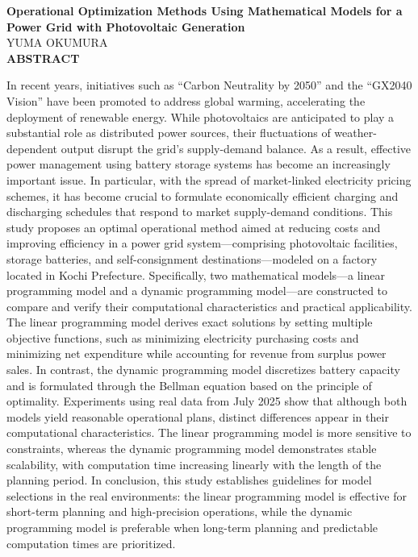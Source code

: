 \begin{center}

{\LARGE \bf Operational Optimization Methods Using Mathematical Models for a Power Grid with Photovoltaic Generation}
\\[0.7cm] 
{\Large YUMA OKUMURA}
\\[1.0cm]
{\LARGE \bf ABSTRACT}
\end{center}

In recent years, initiatives such as ``Carbon Neutrality by 2050'' and the ``GX2040 Vision'' have been promoted to address global warming, accelerating the deployment of renewable energy. While photovoltaics are anticipated to play a substantial role as distributed power sources, their fluctuations of weather-dependent output disrupt the grid's supply-demand balance. As a result, effective power management using battery storage systems has become an increasingly important issue. In particular, with the spread of market-linked electricity pricing schemes, it has become crucial to formulate economically efficient charging and discharging schedules that respond to market supply-demand conditions.
This study proposes an optimal operational method aimed at reducing costs and improving efficiency in a power grid system---comprising photovoltaic facilities, storage batteries, and self-consignment destinations---modeled on a factory located in Kochi Prefecture. Specifically, two mathematical models---a linear programming model and a dynamic programming model---are constructed to compare and verify their computational characteristics and practical applicability. The linear programming model derives exact solutions by setting multiple objective functions, such as minimizing electricity purchasing costs and minimizing net expenditure while accounting for revenue from surplus power sales. In contrast, the dynamic programming model discretizes battery capacity and is formulated through the Bellman equation based on the principle of optimality.
Experiments using real data from July 2025 show that although both models yield reasonable operational plans, distinct differences appear in their computational characteristics. The linear programming model is more sensitive to constraints, whereas the dynamic programming model demonstrates stable scalability, with computation time increasing linearly with the length of the planning period. In conclusion, this study establishes guidelines for model selections in the real environments: the linear programming model is effective for short-term planning and high-precision operations, while the dynamic programming model is preferable when long-term planning and predictable computation times are prioritized.


